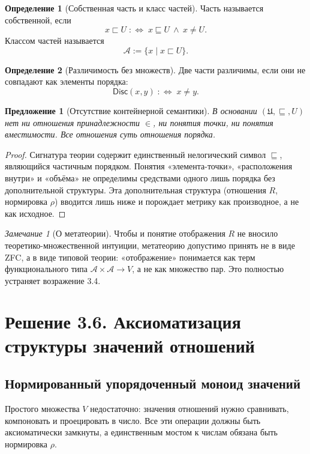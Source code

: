 \documentclass[12pt,a4paper]{article}
\theoremstyle{definition}
\newtheorem{definition}{Определение}[section]
\theoremstyle{plain}
\newtheorem{proposition}{Предложение}[section]
\theoremstyle{remark}
\newtheorem{remark}{Замечание}[section]
\newcommand{\Whole}{U}
\newcommand{\Parts}{\mathcal A}
\newcommand{\Rel}{R}
\newcommand{\Values}{V}
\newcommand{\PartOf}{\sqsubseteq}
\newcommand{\PropPart}{\sqsubset}
\newcommand{\norm}{\rho}
\newcommand{\Disc}{\mathsf{Disc}}
\begin{document}
\begin{definition}[Собственная часть и класс частей]
Часть называется собственной, если
\[
x\PropPart\Whole \;:\Longleftrightarrow\; x\PartOf\Whole\ \wedge\ x\neq\Whole.
\]
Классом частей называется
\[
\Parts:=\{x \mid x\PropPart\Whole\}.
\]
\end{definition}

\begin{definition}[Различимость без множеств]
Две части различимы, если они не совпадают как элементы порядка:
\[
\Disc(x,y)\;:\Longleftrightarrow\; x\neq y.
\]
\end{definition}

\begin{proposition}[Отсутствие контейнерной семантики]
В основании $(\mathfrak U,\PartOf,\Whole)$ нет ни отношения принадлежности $\in$,
ни понятия точки, ни понятия вместимости. Все отношения суть отношения порядка.
\end{proposition}

\begin{proof}
Сигнатура теории содержит единственный нелогический символ $\PartOf$, являющийся
частичным порядком. Понятия «элемента-точки», «расположения внутри» и «объёма» не
определимы средствами одного лишь порядка без дополнительной структуры. Эта
дополнительная структура (отношения $\Rel$, нормировка $\norm$) вводится лишь
ниже и порождает метрику как производное, а не как исходное.
\end{proof}

\begin{remark}[О метатеории]
Чтобы и понятие отображения $\Rel$ не вносило теоретико-множественной интуиции,
метатеорию допустимо принять не в виде ZFC, а в виде типовой теории: «отображение»
понимается как терм функционального типа $\Parts\times\Parts\to\Values$, а не как
множество пар. Это полностью устраняет возражение 3.4.
\end{remark}

\section{Решение 3.6. Аксиоматизация структуры значений отношений}

\subsection{Нормированный упорядоченный моноид значений}

Простого множества $\Values$ недостаточно: значения отношений нужно сравнивать,
компоновать и проецировать в число. Все эти операции должны быть аксиоматически
замкнуты, а единственным мостом к числам обязана быть нормировка $\norm$.
\end{document}
